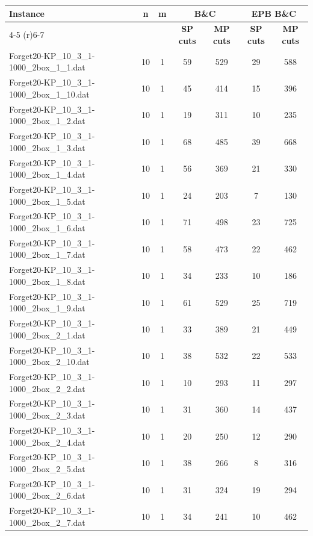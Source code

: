 \begin{table}[!ht]
\centering
\hspace*{-1cm}\begin{tabular}{lcccccc}
\toprule
\textbf{Instance} & \textbf{n} & \textbf{m} & \multicolumn{2}{c}{\textbf{B\&C}}  & \multicolumn{2}{c}{\textbf{EPB B\&C}}
\\
\cmidrule(r){4-5} \cmidrule(r){6-7} 
~ & ~ & ~ & \textbf{SP cuts} &\textbf{MP cuts} & \textbf{SP cuts} &\textbf{MP cuts} \\
\midrule

Forget20-KP\_10\_3\_1-1000\_2box\_1\_1.dat & 10 & 1 & 59 & 529 & 29 & 588 \\
Forget20-KP\_10\_3\_1-1000\_2box\_1\_10.dat & 10 & 1 & 45 & 414 & 15 & 396 \\
Forget20-KP\_10\_3\_1-1000\_2box\_1\_2.dat & 10 & 1 & 19 & 311 & 10 & 235 \\
Forget20-KP\_10\_3\_1-1000\_2box\_1\_3.dat & 10 & 1 & 68 & 485 & 39 & 668 \\
Forget20-KP\_10\_3\_1-1000\_2box\_1\_4.dat & 10 & 1 & 56 & 369 & 21 & 330 \\
Forget20-KP\_10\_3\_1-1000\_2box\_1\_5.dat & 10 & 1 & 24 & 203 & 7 & 130 \\
Forget20-KP\_10\_3\_1-1000\_2box\_1\_6.dat & 10 & 1 & 71 & 498 & 23 & 725 \\
Forget20-KP\_10\_3\_1-1000\_2box\_1\_7.dat & 10 & 1 & 58 & 473 & 22 & 462 \\
Forget20-KP\_10\_3\_1-1000\_2box\_1\_8.dat & 10 & 1 & 34 & 233 & 10 & 186 \\
Forget20-KP\_10\_3\_1-1000\_2box\_1\_9.dat & 10 & 1 & 61 & 529 & 25 & 719 \\
Forget20-KP\_10\_3\_1-1000\_2box\_2\_1.dat & 10 & 1 & 33 & 389 & 21 & 449 \\
Forget20-KP\_10\_3\_1-1000\_2box\_2\_10.dat & 10 & 1 & 38 & 532 & 22 & 533 \\
Forget20-KP\_10\_3\_1-1000\_2box\_2\_2.dat & 10 & 1 & 10 & 293 & 11 & 297 \\
Forget20-KP\_10\_3\_1-1000\_2box\_2\_3.dat & 10 & 1 & 31 & 360 & 14 & 437 \\
Forget20-KP\_10\_3\_1-1000\_2box\_2\_4.dat & 10 & 1 & 20 & 250 & 12 & 290 \\
Forget20-KP\_10\_3\_1-1000\_2box\_2\_5.dat & 10 & 1 & 38 & 266 & 8 & 316 \\
Forget20-KP\_10\_3\_1-1000\_2box\_2\_6.dat & 10 & 1 & 31 & 324 & 19 & 294 \\
Forget20-KP\_10\_3\_1-1000\_2box\_2\_7.dat & 10 & 1 & 34 & 241 & 10 & 462 \\

\end{tabular}
\end{table}
